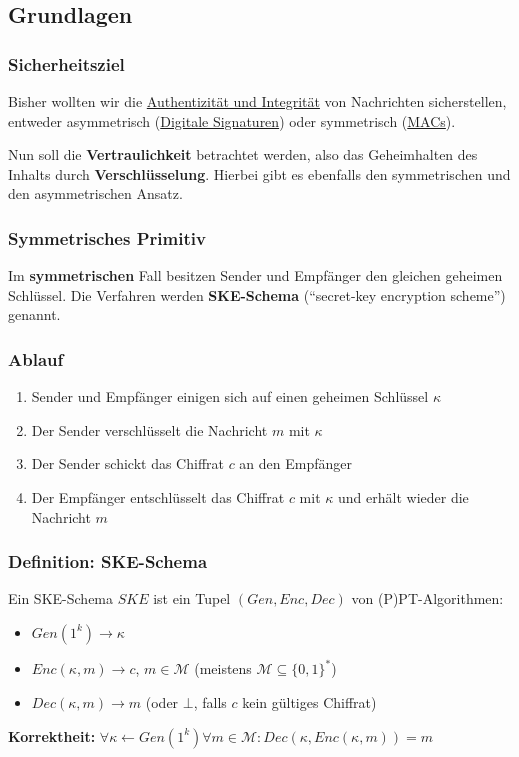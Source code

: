 \documentclass[12pt,A4]{extarticle}
\newcommand{\highlight}[1]{\textcolor{highlightColor}{\textbf{#1}}}
\begin{document}
\subsection{Grundlagen}
\subsubsection{Sicherheitsziel}
Bisher wollten wir die \hyperref[sec:zielDigitaleSignaturen]{Authentizität und Integrität} von Nachrichten sicherstellen, entweder asymmetrisch (\hyperref[sec:signaturenDefinition]{Digitale Signaturen}) oder symmetrisch (\hyperref[sec:MACs]{MACs}).\par
Nun soll die \highlight{Vertraulichkeit} betrachtet werden, also das Geheimhalten des Inhalts durch \textbf{Verschlüsselung}. Hierbei gibt es ebenfalls den symmetrischen und den asymmetrischen Ansatz.

\subsubsection{Symmetrisches Primitiv}
Im \textbf{symmetrischen} Fall besitzen Sender und Empfänger den gleichen geheimen Schlüssel. Die Verfahren werden \highlight{SKE-Schema} (``secret-key encryption scheme'') genannt.

\subsubsection{Ablauf}
\begin{enumerate}
  \item{Sender und Empfänger einigen sich auf einen geheimen Schlüssel $\kappa$}
  \item{Der Sender verschlüsselt die Nachricht $m$ mit $\kappa$}
  \item{Der Sender schickt das Chiffrat $c$ an den Empfänger}
  \item{Der Empfänger entschlüsselt das Chiffrat $c$ mit $\kappa$ und erhält wieder die Nachricht $m$}
\end{enumerate}

\subsubsection{Definition: SKE-Schema}
Ein SKE-Schema $SKE$ ist ein Tupel $(Gen, Enc, Dec)$ von (P)PT-Algorithmen:
\begin{itemize}
  \item{$Gen(1^k) \rightarrow \kappa$}
  \item{$Enc(\kappa, m) \rightarrow c$, $m \in \mathcal{M}$ \hspace{1cm} (meistens $\mathcal{M} \subseteq {\{0, 1\}}^*$)}
  \item{$Dec(\kappa, m) \rightarrow  m$ \hspace{2.515cm} (oder $\bot$, falls $c$ kein gültiges Chiffrat)}
\end{itemize}
\textbf{Korrektheit:} $\forall \kappa \leftarrow Gen(1^k) \forall m \in \mathcal{M}: Dec(\kappa, Enc(\kappa, m)) = m$
\end{document}
